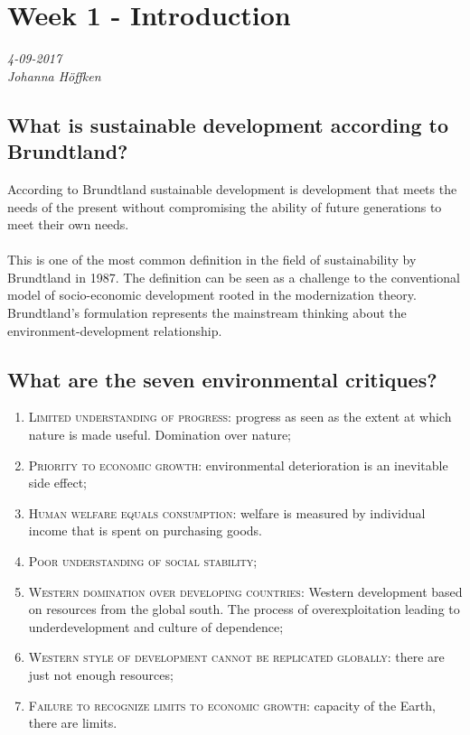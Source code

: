 \chapter{Week 1 - Introduction}
\textit{4-09-2017 \\
Johanna Höffken \\} 

\section{What is sustainable development according to Brundtland?}
According to Brundtland sustainable development is development that meets the needs of the present without compromising the ability of future generations to meet their own needs. \\
\\
This is one of the most common definition in the field of sustainability by Brundtland in 1987. The definition can be seen as a challenge to the conventional model of socio-economic development rooted in the modernization theory. Brundtland's formulation represents the mainstream thinking about the environment-development relationship. 

\section{What are the seven environmental critiques?}
\begin{enumerate}
\item \textsc{Limited understanding of progress}: progress as seen as the extent at which nature is made useful. Domination over nature;
\item \textsc{Priority to economic growth}: environmental deterioration is an inevitable side effect;
\item \textsc{Human welfare equals consumption}: welfare is measured by individual income that is spent on purchasing goods. 
\item \textsc{Poor understanding of social stability};
\item \textsc{Western domination over developing countries}: Western development based on resources from the global south. The process of overexploitation leading to underdevelopment and culture of dependence;
\item \textsc{Western style of development cannot be replicated globally}: there are just not enough resources;
\item \textsc{Failure to recognize limits to economic growth}: capacity of the Earth, there are limits.
\end{enumerate}

